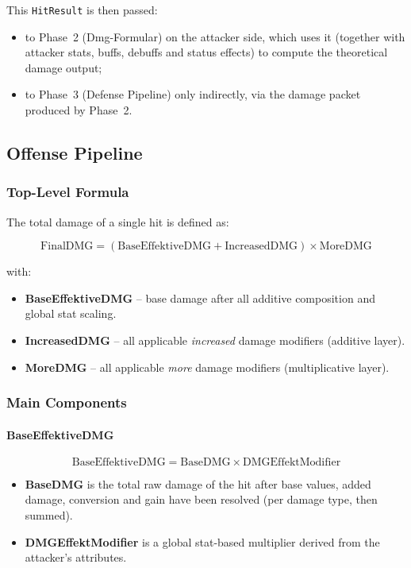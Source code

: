 This \texttt{HitResult} is then passed:
\begin{itemize}
	\item to Phase~2 (Dmg-Formular) on the attacker side, which uses it (together with
	attacker stats, buffs, debuffs and status effects) to compute the theoretical
	damage output;
	\item to Phase~3 (Defense Pipeline) only indirectly, via the damage packet produced
	by Phase~2.
\end{itemize}

\subsection{Offense Pipeline}
\label{subsec:offense-pipeline}

\subsubsection{Top-Level Formula}

The total damage of a single hit is defined as:

\[
\text{FinalDMG} = (\text{BaseEffektiveDMG} + \text{IncreasedDMG}) \times \text{MoreDMG}
\]

with:

\begin{itemize}
	\item \textbf{BaseEffektiveDMG} – base damage after all additive composition and global stat scaling.
	\item \textbf{IncreasedDMG} – all applicable \emph{increased} damage modifiers (additive layer).
	\item \textbf{MoreDMG} – all applicable \emph{more} damage modifiers (multiplicative layer).
\end{itemize}

\subsubsection{Main Components}

\paragraph{BaseEffektiveDMG}

\[
\text{BaseEffektiveDMG} = \text{BaseDMG} \times \text{DMGEffektModifier}
\]

\begin{itemize}
	\item \textbf{BaseDMG} is the total raw damage of the hit after base values, added damage, conversion and gain have been resolved (per damage type, then summed).
	\item \textbf{DMGEffektModifier} is a global stat-based multiplier derived from the attacker’s attributes.
\end{itemize}

